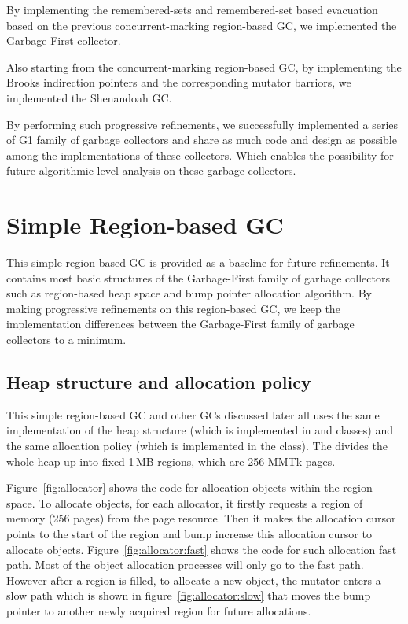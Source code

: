 By implementing the remembered-sets and remembered-set based evacuation based on
the previous concurrent-marking region-based GC, we implemented the Garbage-First collector.

Also starting from the concurrent-marking region-based GC, by implementing the Brooks indirection pointers
and the corresponding mutator barriors, we implemented the Shenandoah GC.

By performing such progressive refinements, we successfully implemented a series of
G1 family of garbage collectors and share as much code and design as possible
among the implementations of these collectors. Which enables the possibility for future
algorithmic-level analysis on these garbage collectors.

\section{Simple Region-based GC}

This simple region-based GC is provided as a baseline for future refinements. It contains
most basic structures of the Garbage-First family of garbage collectors such as
region-based heap space and bump pointer allocation algorithm. By making progressive refinements
on this region-based GC, we keep the implementation differences between the
Garbage-First family of garbage collectors to a minimum.

\subsection{Heap structure and allocation policy}

This simple region-based GC and other GCs discussed later all uses the same implementation of the
heap structure (which is implemented in  and  classes) and the
same allocation policy (which is implemented in the  class).
The  divides the whole heap up into fixed 1\,MB regions, which
are 256 MMTk pages.

Figure~\ref{fig:allocator} shows the code for allocation objects within the region space.
To allocate objects, for each allocator, it firstly requests a region of memory (256 pages) from the page resource.
Then it makes the allocation cursor points to the start of the region and bump increase this
allocation cursor to allocate objects. Figure~\ref{fig:allocator:fast} shows the code for such
allocation fast path. Most of the object allocation processes will only go to the
fast path. 
However after a region is filled, to allocate a new object, the mutator enters a slow path
which is shown in figure~\ref{fig:allocator:slow} that moves the bump pointer to another newly acquired region for future allocations.

